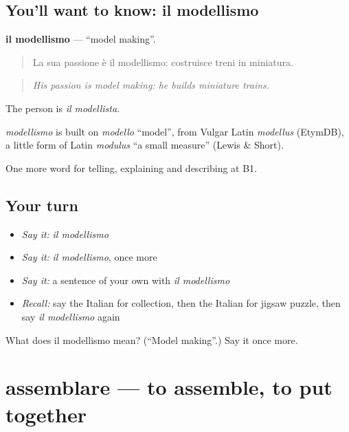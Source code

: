 \subsection*{You'll want to know: il modellismo}
\textbf{il modellismo} — \textquotedblleft{}model making\textquotedblright{}.

\begin{quote}
La sua passione è il modellismo: costruisce treni in miniatura.
\end{quote}

\begin{quote}
\emph{His passion is model making: he builds miniature trains.}
\end{quote}

The person is \emph{il modellista}.

\begin{cousinweb}
\emph{modellismo} is built on \emph{modello} \textquotedblleft{}model\textquotedblright{}, from Vulgar Latin \emph{modellus} (EtymDB), a little form of Latin \emph{modulus} \textquotedblleft{}a small measure\textquotedblright{} (Lewis \& Short).
\end{cousinweb}

\begin{grammarlens}[title={What you've built}]
One more word for telling, explaining and describing at B1.
\end{grammarlens}

\subsection*{Your turn}
\begin{itemize}
\raggedright
  \item \emph{Say it:} \emph{il modellismo}
  \item \emph{Say it:} \emph{il modellismo}, once more
  \item \emph{Say it:} a sentence of your own with \emph{il modellismo}
  \item \emph{Recall:} say the Italian for collection, then the Italian for jigsaw puzzle, then say \emph{il modellismo} again
\end{itemize}

\begin{tcolorbox}[breakable,colback=teal!4,colframe=teal!35!black,title={Before you move on}]
What does il modellismo mean? (\textquotedblleft{}Model making\textquotedblright{}.) Say it once more.
\end{tcolorbox}
\section[assemblare]{assemblare — to assemble, to put together}

